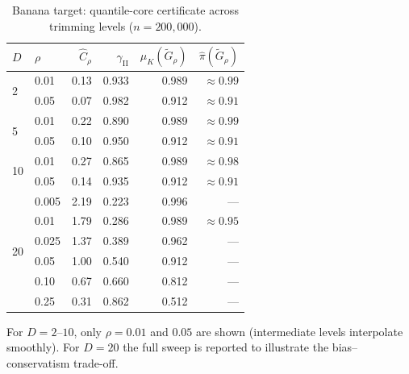 \documentclass[12pt]{article}
\begin{document}
\begin{table}[h]
\centering
\caption{Banana target: quantile-core certificate across trimming levels ($n = 200{,}000$).}
\label{tab:q-banana}
\small
\begin{tabular}{ll rrrr}
\toprule
$D$ & $\rho$ & $\hat{C}_\rho$ & $\gamma_{\mathrm{II}}$ & $\mu_K(\tilde{G}_\rho)$ & $\hat{\pi}(\tilde{G}_\rho)$ \\
\midrule
\multirow{2}{*}{2}
 & 0.01 & 0.13 & 0.933 & 0.989 & $\approx 0.99$ \\
 & 0.05 & 0.07 & 0.982 & 0.912 & $\approx 0.91$ \\
\midrule
\multirow{2}{*}{5}
 & 0.01 & 0.22 & 0.890 & 0.989 & $\approx 0.99$ \\
 & 0.05 & 0.10 & 0.950 & 0.912 & $\approx 0.91$ \\
\midrule
\multirow{2}{*}{10}
 & 0.01 & 0.27 & 0.865 & 0.989 & $\approx 0.98$ \\
 & 0.05 & 0.14 & 0.935 & 0.912 & $\approx 0.91$ \\
\midrule
\multirow{6}{*}{20}
 & 0.005 & 2.19 & 0.223 & 0.996 & --- \\
 & 0.01 & 1.79 & 0.286 & 0.989 & $\approx 0.95$ \\
 & 0.025 & 1.37 & 0.389 & 0.962 & --- \\
 & 0.05 & 1.00 & 0.540 & 0.912 & --- \\
 & 0.10 & 0.67 & 0.660 & 0.812 & --- \\
 & 0.25 & 0.31 & 0.862 & 0.512 & --- \\
\bottomrule
\end{tabular}

\smallskip
\begin{minipage}{\linewidth}
\small For $D = 2$--$10$, only $\rho = 0.01$ and $0.05$ are shown (intermediate levels interpolate smoothly). For $D = 20$ the full sweep is reported to illustrate the bias--conservatism trade-off.
\end{minipage}
\end{table}
\end{document}
